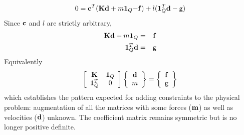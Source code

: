 \documentclass[10pt]{article}
\newcommand{\curly}{\sf }
\begin{document}
	\begin{equation}
		0= {\bf c}^T({\bf Kd} + m{\bf 1}_Q {\bf -f}) + l ({\bf 1}_Q^T {\bf d} -\mbox{\curly g})
	\end{equation}
Since  $\bf c$ and $l$ are strictly  arbitrary,
	\begin{eqnarray}
		{\bf Kd }+m{\bf 1}_Q &=& {\bf f}\\
		{\bf 1}_Q^T {\bf d} & = & \mbox{\curly g} 
	\end{eqnarray}
Equivalently
	\begin{equation}
		\left[ \begin{array}{cc} {\bf K} & {\bf 1}_Q \\
				    {\bf 1}_Q^T & 0 \end{array} \right]
		\left\{ \begin{array}{c} {\bf d} \\
				     m \end{array} \right\} =
		\left\{\begin{array}{c} {\bf f} \\
				     \mbox{\curly g} \end{array} \right\}
	\end{equation}
which establishes the pattern  expected  for adding constraints to the physical problem: augmentation of 
all the matrices with some forces ($\bf m$) as well as velocities ($\bf d$)  unknown. The coefficient matrix remains
symmetric but is no longer positive definite.
\end{document}
